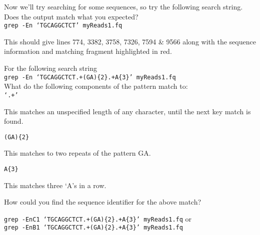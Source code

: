 \begin{steps}
Now we'll try searching for some sequences, so try the following search string. 
Does the output match what you expected? \\
\texttt{grep -En `TGCAGGCTCT' myReads1.fq}
\end{steps}

This should give lines 774, 3382, 3758, 7326, 7594 \& 9566 along with the sequence information and matching fragment highlighted in red.\\

\begin{questions}
For the following search string \\
\texttt{grep -En `TGCAGGCTCT.+(GA)\{2\}.+A\{3\}' myReads1.fq} \\
What do the following components of the pattern match to: \\
\texttt{`.+'} \\
\begin{answer}
This matches an unspecified length of any character, until the next key match is found. \\
\end{answer}

\texttt{(GA)\{2\}} \\
\begin{answer}
This matches to two repeats of the pattern GA. \\
\end{answer}

\texttt{A\{3\}}\\
\begin{answer}
This matches three `A's in a row. \\
\end{answer}

How could you find the sequence identifier for the above match?\\
\begin{answer}
\texttt{grep -EnC1 `TGCAGGCTCT.+(GA)\{2\}.+A\{3\}' myReads1.fq} or \\
\texttt{grep -EnB1 `TGCAGGCTCT.+(GA)\{2\}.+A\{3\}' myReads1.fq}
\end{answer}
\end{questions}

